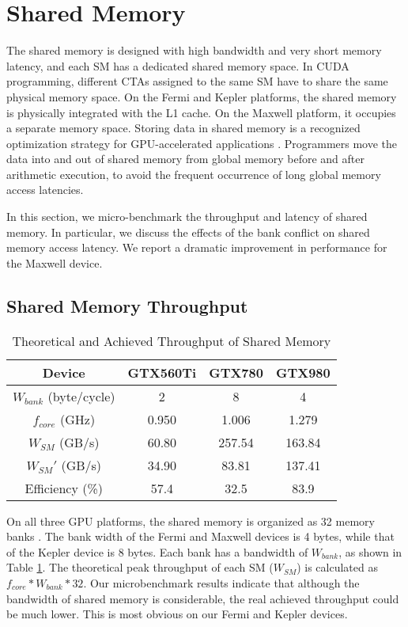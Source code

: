 \documentclass[10pt,journal,compsoc]{IEEEtran}
\theoremstyle{definition}
\begin{document}
\section{Shared Memory}
The shared memory is designed with high bandwidth and very short memory latency, and each SM has a dedicated shared memory space. In CUDA programming, different CTAs assigned to the same SM have to share the same physical memory space. On the Fermi and Kepler platforms, the shared memory is physically integrated with the L1 cache. On the Maxwell platform, it occupies a separate memory space. Storing data in shared memory is a recognized optimization strategy for GPU-accelerated applications \cite{li2014accelerating,matrixmul_SDK,zhao2014g}. Programmers move the data into and out of shared memory from global memory before and after arithmetic execution, to avoid the frequent occurrence of long global memory access latencies.

In this section, we micro-benchmark the throughput and latency of shared memory. In particular, we discuss the effects of the bank conflict on shared memory access latency. We report a dramatic improvement in performance for the Maxwell device.

\subsection{Shared Memory Throughput}

\begin{table}

\renewcommand{\arraystretch}{1.2}
\centering
\caption{Theoretical and Achieved Throughput of Shared Memory}
    \begin{tabular}{|c|c|c|c|}
            \hline
            Device & GTX560Ti & GTX780 & GTX980 \\ \hline
            $W_{bank}$ (byte/cycle) & 2 & 8 & 4 \\ \hline
            $f_{core}$ (GHz) & 0.950 & 1.006 & 1.279 \\ \hline
            $W_{SM}$ (GB/s) & 60.80 & 257.54 & 163.84 \\ \hline
            $W_{SM}'$ (GB/s) & 34.90 & 83.81 & 137.41 \\ \hline
            Efficiency (\%) & 57.4 & 32.5 & 83.9 \\ \hline
    \end{tabular}
\label{tab:sharedThroughputParameters}
\end{table}

On all three GPU platforms, the shared memory is organized as 32 memory banks \cite{cudacprogrammingguide}. The bank width of the Fermi and Maxwell devices is 4 bytes, while that of the Kepler device is 8 bytes. Each bank has a bandwidth of $W_{bank}$, as shown in Table \ref{tab:sharedThroughputParameters}. The theoretical peak throughput of each SM ($W_{SM}$) is calculated as $f_{core} * W_{bank} * 32$. Our microbenchmark results indicate that although the bandwidth of shared memory is considerable, the real achieved throughput could be much lower. This is most obvious on our Fermi and Kepler devices.
\end{document}
